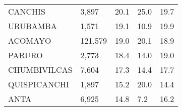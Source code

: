 \begin{tabular}{lllll}
	\cellcolor[HTML]{FF5050}CANCHIS                                & 3,897                                                                 & 20.1                                                                             & 25.0                                                                        & 19.7                                                                                \\
	\cellcolor[HTML]{FF5050}URUBAMBA                               & 1,571                                                                 & 19.1                                                                             & 10.9                                                                        & 19.9                                                                                \\
	\cellcolor[HTML]{FF5050}ACOMAYO                                & 121,579                                                               & 19.0                                                                             & 20.1                                                                        & 18.9                                                                                \\
	\cellcolor[HTML]{FF5050}PARURO                                 & 2,773                                                                 & 18.4                                                                             & 14.0                                                                        & 19.0                                                                                \\
	\cellcolor[HTML]{FF5050}CHUMBIVILCAS                           & 7,604                                                                 & 17.3                                                                             & 14.4                                                                        & 17.7                                                                                \\
	\cellcolor[HTML]{FF5050}QUISPICANCHI                           & 1,897                                                                 & 15.2                                                                             & 20.0                                                                        & 14.4                                                                                \\
	\cellcolor[HTML]{FF5050}ANTA                                   & 6,925                                                                 & 14.8                                                                             & 7.2                                                                         & 16.2                                                                                \\

\end{tabular}
